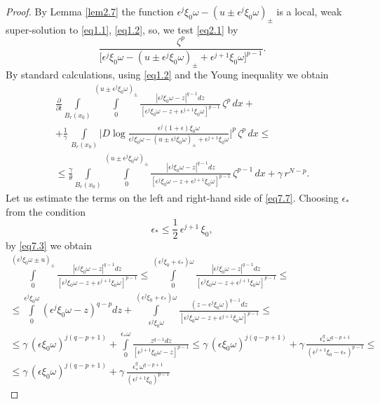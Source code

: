 \documentclass[a4paper,11pt,fullpage]{article}
\numberwithin{equation}{section}
\begin{document}
\begin{proof}
By Lemma \ref{lem2.7} the function $\epsilon^j\xi_0\omega-(u\pm \epsilon^j\xi_0\omega)_{\pm}$ is a local, weak super-solution to \eqref{eq1.1}, \eqref{eq1.2}, so, we test
\eqref{eq2.1} by
$$\frac{\zeta^p}{\big[\epsilon^j\xi_0\omega-(u\pm \epsilon^j\xi_0\omega)_{\pm}+\epsilon^{j+1}\xi_0\omega\big]^{p-1}}.$$
By standard calculations, using \eqref{eq1.2} and the Young inequality we obtain
\begin{multline}\label{eq7.7}
\frac{\partial}{\partial t}\int\limits_{B_r(x_0)}\int\limits^{(u\pm\epsilon^j\xi_0\omega)_{\pm}}_0\frac{|\epsilon^j\xi_0\omega-z|^{q-1} dz}{[\epsilon^j\xi_0\omega-z+\epsilon^{j+1}\xi_0\omega]^{p-1}}\,\zeta^p\,dx+\\+
\frac{1}{\gamma}\,\int\limits_{B_r(x_0)}\Big|D \log\frac{\epsilon^j(1+\epsilon)\xi_0\omega}{\epsilon^j\xi_0\omega-(u\pm\epsilon^j\xi_0\omega)_{\pm}+
\epsilon^{j+1}\xi_0\omega}\Big|^p\,
\zeta^p\,dx\leqslant\\\leqslant \frac{\gamma}{\theta}\int\limits_{B_r(x_0)}\int\limits^{(u\pm\epsilon^j\xi_0\omega)_{\pm}}_0\frac{|\epsilon^j\xi_0\omega-z|^{q-1} dz}{[\epsilon^j\xi_0\omega-z+\epsilon^{j+1}\xi_0\omega]^{p-1}}\,\zeta^{p-1}\,dx+\gamma\,r^{N-p}.
\end{multline}
Let us estimate the terms on the left and right-hand side of \eqref{eq7.7}. Choosing $\epsilon_*$ from the condition
$$\epsilon_* \leqslant \frac{1}{2}\, \epsilon^{j+1}\,\xi_0,$$
by \eqref{eq7.3} we obtain
\begin{multline*}
\int\limits^{(\epsilon^j\xi_0\omega\pm u)_{\pm}}_0\frac{|\epsilon^j\xi_0\omega-z|^{q-1} dz}{[\epsilon^j\xi_0\omega-z+\epsilon^{j+1}\xi_0\omega]^{p-1}} \leqslant
\int\limits^{(\epsilon^j\xi_0+\epsilon_*)\omega}_0\frac{|\epsilon^j\xi_0\omega-z|^{q-1} dz}{[\epsilon^j\xi_0\omega-z+\epsilon^{j+1}\xi_0\omega]^{p-1}}\leqslant\\\leqslant
\int\limits^{\epsilon^j\xi_0\omega}_0
(\epsilon^j\xi_0\omega-z)^{q-p} dz +\int\limits^{(\epsilon^j\xi_0+\epsilon_*)\omega}_{\epsilon^j\xi_0\omega}
\frac{(z-\epsilon^j\xi_0\omega)^{q-1} dz}{[\epsilon^j\xi_0\omega-z+\epsilon^{j+1}\xi_0\omega]^{p-1}}\leqslant\\\leqslant 
\gamma\,(\epsilon \xi_0 \omega)^{j(q-p+1)}+\int\limits_0^{\epsilon_* \omega}\frac{z^{q-1} dz}{[\epsilon^{j+1}\xi_0 \omega-z]^{p-1}}\leqslant
\gamma\,(\epsilon \xi_0 \omega)^{j(q-p+1)}+\gamma\,\frac{\epsilon^{q}_*\,\omega^{q-p+1}}{(\epsilon^{j+1}\xi_0-\epsilon_*)^{p-1}}
\leqslant\\\leqslant
\gamma\,(\epsilon \xi_0 \omega)^{j(q-p+1)}+\gamma\,\frac{\epsilon^{q}_*\,\omega^{q-p+1}}{(\epsilon^{j+1}\xi_0)^{p-1}}

\end{multline*}
\end{proof}
\end{document}
